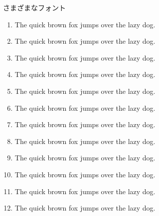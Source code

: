\documentclass[aspectratio=169, xcolor={dvipsnames,table}]{beamer}
\begin{document}
  \begin{frame}[plain]{さまざまなフォント}
    \small
    \begin{enumerate}[<+->]

      \item { The quick brown fox jumps over the lazy dog.}

      \item { The quick brown fox jumps over the lazy dog.}



      \item { The quick brown fox jumps over the lazy dog.}

      \item { The quick brown fox jumps over the lazy dog.}


      \item { The quick brown fox jumps over the lazy dog.}

      \item { The quick brown fox jumps over the lazy dog.}


      \item { The quick brown fox jumps over the lazy dog.}

      \item { The quick brown fox jumps over the lazy dog.}

      \item { The quick brown fox jumps over the lazy dog.}


      \item { The quick brown fox jumps over the lazy dog.}

      \item { The quick brown fox jumps over the lazy dog.}

      \item { The quick brown fox jumps over the lazy dog.}
    \end{enumerate}
  \end{frame}
\end{document}

